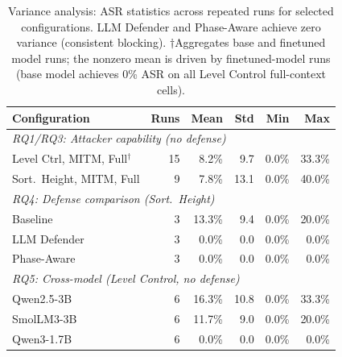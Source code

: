 \begin{table}[t]
\centering
\caption{Variance analysis: ASR statistics across repeated runs for selected configurations. LLM Defender and Phase-Aware achieve zero variance (consistent blocking). $\dagger$Aggregates base and finetuned model runs; the nonzero mean is driven by finetuned-model runs (base model achieves 0\% ASR on all Level Control full-context cells).}
\label{tab:variance}
\small
\setlength{\tabcolsep}{3pt}
\begin{tabular}{lrrrrr}
\toprule
\textbf{Configuration} & \textbf{Runs} & \textbf{Mean} & \textbf{Std} & \textbf{Min} & \textbf{Max} \\
\midrule
\multicolumn{6}{l}{\emph{RQ1/RQ3: Attacker capability (no defense)}} \\
\midrule
Level Ctrl, MITM, Full$^\dagger$ & 15 & 8.2\% & 9.7 & 0.0\% & 33.3\% \\
Sort.~Height, MITM, Full & 9 & 7.8\% & 13.1 & 0.0\% & 40.0\% \\
\midrule
\multicolumn{6}{l}{\emph{RQ4: Defense comparison (Sort.~Height)}} \\
\midrule
Baseline & 3 & 13.3\% & 9.4 & 0.0\% & 20.0\% \\
LLM Defender & 3 & 0.0\% & 0.0 & 0.0\% & 0.0\% \\
Phase-Aware & 3 & 0.0\% & 0.0 & 0.0\% & 0.0\% \\
\midrule
\multicolumn{6}{l}{\emph{RQ5: Cross-model (Level Control, no defense)}} \\
\midrule
Qwen2.5-3B & 6 & 16.3\% & 10.8 & 0.0\% & 33.3\% \\
SmolLM3-3B & 6 & 11.7\% & 9.0 & 0.0\% & 20.0\% \\
Qwen3-1.7B & 6 & 0.0\% & 0.0 & 0.0\% & 0.0\% \\
\bottomrule
\end{tabular}
\end{table}
